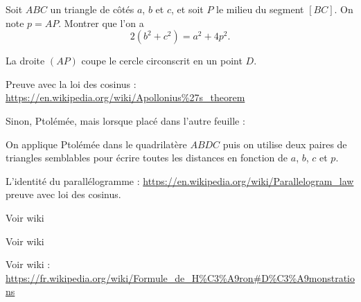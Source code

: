 \begin{exo}
Soit $ABC$ un triangle de côtés $a$, $b$ et $c$, et soit $P$ le milieu du segment $[BC]$. On note $p=AP$.
Montrer que l'on a 
\[ 2(b^2+c^2)=a^2+4p^2.\]
\begin{hint}
La droite $(AP)$ coupe le cercle circonscrit en un point $D$. 
\end{hint}
\begin{sol}


Preuve avec la loi des cosinus : \url{https://en.wikipedia.org/wiki/Apollonius%27s_theorem}

Sinon, Ptolémée, mais lorsque placé dans l'autre feuille : 

On applique Ptolémée dans le quadrilatère $ABDC$ puis on utilise deux paires de triangles semblables pour écrire toutes les distances en fonction de $a$, $b$, $c$ et $p$.
\end{sol}
\end{exo}


\begin{exo}
L'identité du parallélogramme : \url{https://en.wikipedia.org/wiki/Parallelogram_law} preuve avec loi des cosinus.
\begin{hint}
\end{hint}
\begin{sol}
\end{sol}
\end{exo}



\begin{exo}
Voir wiki
\begin{hint}
\end{hint}
\begin{sol}
\end{sol}
\end{exo}

\begin{exo}
Voir wiki
\begin{hint}
\end{hint}
\begin{sol}
\end{sol}
\end{exo}

\begin{exo}
Voir wiki : \url{https://fr.wikipedia.org/wiki/Formule_de_H%C3%A9ron#D%C3%A9monstrations}
\begin{hint}
\end{hint}
\begin{sol}
\end{sol}
\end{exo}


